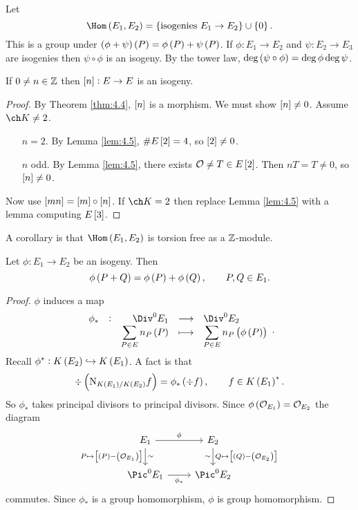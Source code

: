 Let
$$ \Hom\br{E_1, E_2} = \cbr{\text{isogenies} \ E_1 \to E_2} \cup \cbr{0}. $$
This is a group under $ \br{\phi + \psi}\br{P} = \phi\br{P} + \psi\br{P} $. If $ \phi : E_1 \to E_2 $ and $ \psi : E_2 \to E_3 $ are isogenies then $ \psi \circ \phi $ is an isogeny. By the tower law, $ \deg \br{\psi \circ \phi} = \deg \phi\deg \psi $.

\begin{lemma}
If $ 0 \ne n \in \mathbb{Z} $ then $ \sbr{n} : E \to E $ is an isogeny.
\end{lemma}

\begin{proof}
By Theorem \ref{thm:4.4}, $ \sbr{n} $ is a morphism. We must show $ \sbr{n} \ne 0 $. Assume $ \ch K \ne 2 $.
\begin{itemize}[leftmargin=0.5in]
\item[$ n = 2 $.] By Lemma \ref{lem:4.5}, $ \#E\sbr{2} = 4 $, so $ \sbr{2} \ne 0 $.
\item[$ n $ odd.] By Lemma \ref{lem:4.5}, there exists $ \OOO \ne T \in E\sbr{2} $. Then $ nT = T \ne 0 $, so $ \sbr{n} \ne 0 $.
\end{itemize}
Now use $ \sbr{mn} = \sbr{m} \circ \sbr{n} $. If $ \ch K = 2 $ then replace Lemma \ref{lem:4.5} with a lemma computing $ E\sbr{3} $.
\end{proof}

A corollary is that $ \Hom\br{E_1, E_2} $ is torsion free as a $ \mathbb{Z} $-module.

\begin{lemma}
Let $ \phi : E_1 \to E_2 $ be an isogeny. Then
$$ \phi\br{P + Q} = \phi\br{P} + \phi\br{Q}, \qquad P, Q \in E_1. $$
\end{lemma}

\begin{proof}
$ \phi $ induces a map
$$ \function[\phi_*]{\Div^0 E_1}{\Div^0 E_2}{\sum_{P \in E} n_P\br{P}}{\sum_{P \in E} n_P\br{\phi\br{P}}}. $$
Recall $ \phi^* : K\br{E_2} \hookrightarrow K\br{E_1} $. A fact is that
$$ \div \br{\N_{K\br{E_1} / K\br{E_2}} f} = \phi_*\br{\div f}, \qquad f \in K\br{E_1}^*. $$
So $ \phi_* $ takes principal divisors to principal divisors. Since $ \phi\br{\OOO_{E_1}} = \OOO_{E_2} $ the diagram
$$
\begin{tikzcd}
E_1 \arrow{r}{\phi} \arrow{d}{\sim}[swap]{P \mapsto \sbr{\br{P} - \br{\OOO_{E_1}}}} & E_2 \arrow{d}{Q \mapsto \sbr{\br{Q} - \br{\OOO_{E_2}}}}[swap]{\sim} \\
\Pic^0 E_1 \arrow{r}[swap]{\phi_*} & \Pic^0 E_2
\end{tikzcd}
$$
commutes. Since $ \phi_* $ is a group homomorphism, $ \phi $ is group homomorphism.
\end{proof}

